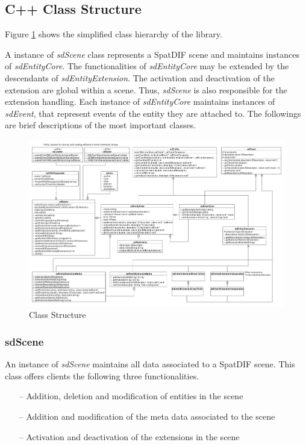 \documentclass[a4paper]{article}
\begin{document}
\subsection{C++ Class Structure}

Figure \ref{fig:class_structure} shows the simplified class hierarchy of the library. 

A instance of {\it sdScene} class represents a SpatDIF scene and maintains instances of {\it sdEntityCore}. The functionalities of {\it sdEntityCore} may be extended by the descendants of {\it sdEntityExtension}. 
The activation and deactivation of the extension are global within a scene. 
Thus, {\it sdScene} is also responsible for the extension handling. 
Each instance of {\it sdEntityCore} maintains instances of {\it sdEvent}, that represent events of the entity they are attached to.
The followings are brief descriptions of the most important classes.

\begin{figure}[t]
\centerline{
	\includegraphics[width= 17.5cm]{classes.pdf}}
\caption{Class Structure}
\label{fig:class_structure}
\end{figure}

\subsubsection{sdScene}
An instance of {\it sdScene} maintains all data associated to a SpatDIF scene. This class offers clients the following three functionalities.

\begin{itemize}[leftmargin=*]
\item[--] Addition, deletion and modification of entities in the scene
\item[--] Addition and modification of the meta data associated to the scene
\item[--] Activation and deactivation of the extensions in the scene
\end{itemize}
\end{document}
